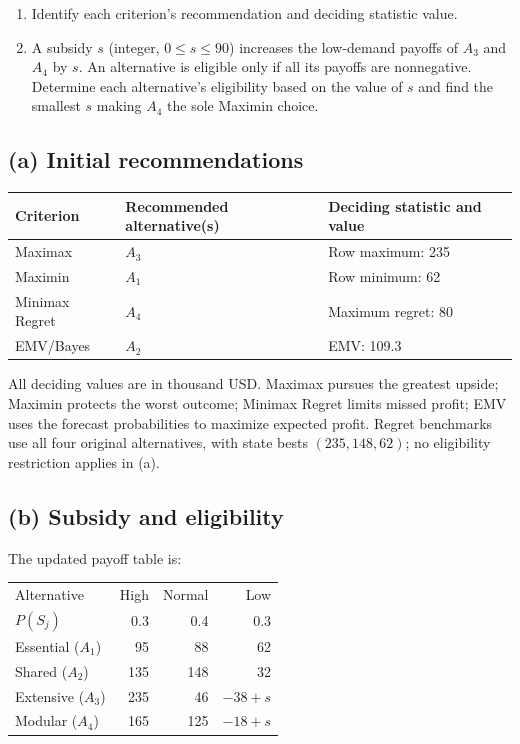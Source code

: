 \begin{enumerate}[label=\textbf{(\alph*)},leftmargin=*]
	\item Identify each criterion's recommendation and deciding statistic value. 

	\item A subsidy $s$ (integer, $0\leq s\leq90$) increases the low-demand payoffs of $A_3$ and $A_4$ by $s$. An alternative is eligible only if all its payoffs are nonnegative. Determine each alternative's eligibility based on the value of $s$ and find the smallest $s$ making $A_4$ the sole Maximin choice.
\end{enumerate}
\label{sol:q1a}
\subsection*{(a) Initial recommendations }
\begin{center}
\begin{tabular}{lll}\toprule
Criterion & Recommended alternative(s) & Deciding statistic and value\\ \midrule
		Maximax & $A_3$ & Row maximum: 235\\
		Maximin & $A_1$ & Row minimum: 62\\
		Minimax Regret & $A_4$ & Maximum regret: 80\\
		EMV/Bayes & $A_2$ & EMV: 109.3\\
		\bottomrule\end{tabular}
\end{center}
All deciding values are in thousand USD. Maximax pursues the greatest upside; Maximin protects the worst outcome; Minimax Regret limits missed profit; EMV uses the forecast probabilities to maximize expected profit. Regret benchmarks use all four original alternatives, with state bests $(235,148,62)$; no eligibility restriction applies in (a).
\secInicio[sec:q1]


\label{sol:q1b}
\subsection*{(b) Subsidy and eligibility }

The updated payoff table is:

\begin{center}\small\setlength{\tabcolsep}{4pt}
	\begin{tabular}{lrrr}\toprule
		Alternative & High & Normal & Low\\
		$P(S_j)$ & 0.3 & 0.4 & 0.3\\ \midrule
				Essential ($A_1$) & 95 & 88 & 62\\
		Shared ($A_2$) & 135 & 148 & 32\\
		Extensive ($A_3$) & 235 & 46 & $-38+s$\\
		Modular ($A_4$) & 165 & 125 & $-18+s$\\
		\bottomrule
	\end{tabular}
\end{center}

